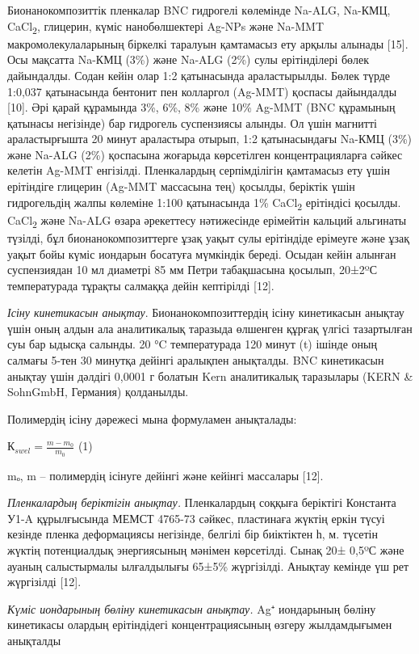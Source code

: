 Бионанокомпозиттік пленкалар BNC гидрогелі көлемінде Na-ALG, Na-КМЦ,
CaCl\textsubscript{2}, глицерин, күміс нанобөлшектері Ag-NPs және Na-MMT
макромолекулаларының біркелкі таралуын қамтамасыз ету арқылы алынады
{[}15{]}. Осы мақсатта Na-КМЦ (3\%) және Na-ALG (2\%) сулы ерітінділері
бөлек дайындалды. Содан кейін олар 1:2 қатынасында араластырылды. Бөлек
түрде 1:0,037 қатынасында бентонит пен колларгол (Ag-MMT) қоспасы
дайындалды {[}10{]}. Әрі қарай құрамында 3\%, 6\%, 8\% және 10\% Ag-MMT
(BNC құрамының қатынасы негізінде) бар гидрогель суспензиясы алынды. Ол
үшін магнитті араластырғышта 20 минут араластыра отырып, 1:2
қатынасындағы Na-КМЦ (3\%) және Na-ALG (2\%) қоспасына жоғарыда
көрсетілген концентрацияларға сәйкес келетін Ag-MMT енгізілді.
Пленкалардың серпімділігін қамтамасыз ету үшін ерітіндіге глицерин
(Ag-MMT массасына тең) қосылды, беріктік үшін гидрогельдің жалпы
көлеміне 1:100 қатынасында 1\% CaCl\textsubscript{2} ерітіндісі қосылды.
CaCl\textsubscript{2} және Na-ALG өзара әрекеттесу нәтижесінде ерімейтін
кальций альгинаты түзілді, бұл бионанокомпозиттерге ұзақ уақыт сулы
ерітіндіде ерімеуге және ұзақ уақыт бойы күміс иондарын босатуға
мүмкіндік береді. Осыдан кейін алынған суспензиядан 10 мл диаметрі 85 мм
Петри табақшасына қосылып, 20±2ºС температурада тұрақты салмаққа дейін
кептірілді {[}12{]}.

\emph{Ісіну кинетикасын анықтау}. Бионанокомпозиттердің ісіну
кинетикасын анықтау үшін оның алдын ала аналитикалық таразыда өлшенген
құрғақ үлгісі тазартылған суы бар ыдысқа салынды. 20 °C температурада
120 минут (t) ішінде оның салмағы 5-тен 30 минутқа дейінгі аралықпен
анықталды. BNC кинетикасын анықтау үшін дәлдігі 0,0001 г болатын Kern
аналитикалық таразылары (KERN \& SohnGmbH, Германия) қолданылды.

Полимердің ісіну дәрежесі мына формуламен анықталады:

\(К_{swel} = \frac{m - m_{0}}{m_{0}}\) (1)

mₒ, m -- полимердің ісінуге дейінгі және кейінгі массалары {[}12{]}.

\emph{Пленкалардың беріктігін анықтау.} Пленкалардың соққыға беріктігі
Константа У1-A құрылғысында МЕМСТ 4765-73 сәйкес, пластинаға жүктің
еркін түсуі кезінде пленка деформациясы негізінде, белгілі бір
биіктіктен һ, м. түсетін жүктің потенциалдық энергиясының мәнімен
көрсетілді. Сынақ 20± 0,5ºС және ауаның салыстырмалы ылғалдылығы 65±5\%
жүргізілді. Анықтау кемінде үш рет жүргізілді {[}12{]}.

\emph{Күміс иондарының бөліну кинетикасын анықтау.} Ag⁺ иондарының
бөліну кинетикасы олардың ерітіндідегі концентрациясының өзгеру
жылдамдығымен анықталды

